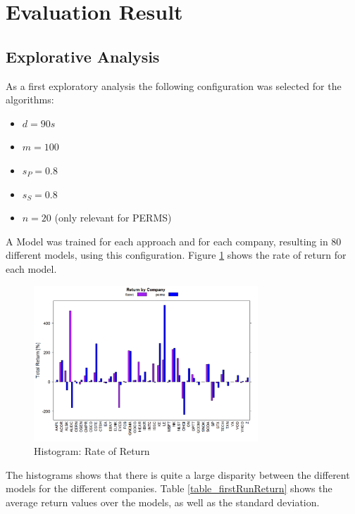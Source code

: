 \section{Evaluation Result}
\label{sec_evaluationResults}

\subsection{Explorative Analysis}
\label{subsec_explorativeAnalysis}

As a first exploratory analysis the following configuration was selected for the algorithms:

\begin{itemize}
	\item $d = 90s$
	\item $m = 100$ 
	\item $s_P = 0.8$
	\item $s_S = 0.8$
	\item $n = 20$ (only relevant for PERMS)
\end{itemize}

A Model was trained for each approach and for each company, resulting in 80 different models, using this configuration. Figure \ref{fig_firstRunReturnByCompany} shows the rate of return for each model.

\begin{figure}[h]
	\centering
  	\includegraphics[width=0.75\textwidth]{firstRunReturnByCompany}
	\caption{Histogram: Rate of Return}
	\label{fig_firstRunReturnByCompany}
\end{figure}

The histograms shows that there is quite a large disparity between the different models for the different companies. Table \ref{table_firstRunReturn} shows the average return values over the models, as well as the standard deviation.

